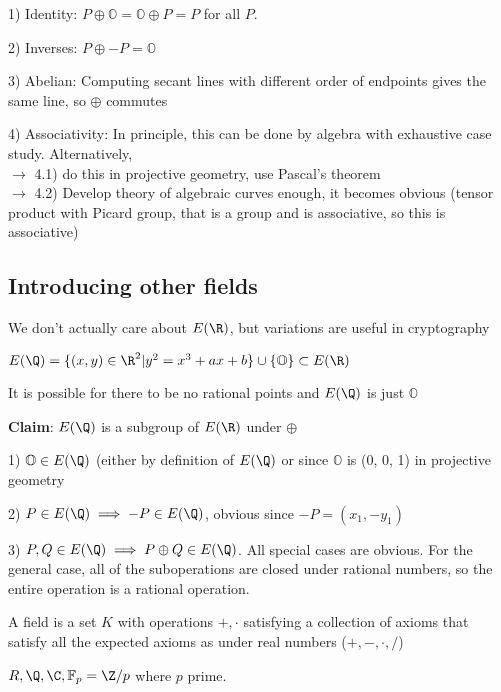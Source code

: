 \documentclass[twoside, 10pt]{article}
\newcommand{\F}{\mathbb{F}}
\renewcommand{\O}{\mathbb{O}}
\begin{document}
1) Identity: $P \oplus \O = \O\oplus P = P$ for all $P$.

2) Inverses: $P \oplus -P = \O$

3) Abelian: Computing secant lines with different order of endpoints gives the same line, so $\oplus$ commutes

4) Associativity: In principle, this can be done by algebra with exhaustive case study. Alternatively, \\
$\to$ 4.1) do this in projective geometry, use Pascal's theorem\\
$\to$ 4.2) Develop theory of algebraic curves enough, it becomes obvious (tensor product with Picard group, that is a group and is associative, so this is associative)

\subsection{Introducing other fields}
\begin{rmk}
    We don't actually care about $E(\R)$, but variations are useful in cryptography
\end{rmk}

\begin{defn}
    $E(\Q) = \{(x, y) \in \R^2 | y^2 = x^3 + ax + b\} \cup \{\O\} \subset E(\R)$
\end{defn}

\begin{rmk}
    It is possible for there to be no rational points and $E(\Q)$ is just $\O$
\end{rmk}

\textbf{Claim}: $E(\Q)$ is a subgroup of $E(\R)$ under $\oplus$

1) $\O \in E(\Q)$ (either by definition of $E(\Q)$ or since $\O$ is (0, 0, 1) in projective geometry

2) $P \in E(\Q) \implies -P \in E(\Q)$, obvious since $-P = (x_1, -y_1)$

3) $P, Q \in E(\Q) \implies P\oplus Q \in E(\Q)$. All special cases are obvious. For the general case, all of the suboperations are closed under rational numbers, so the entire operation is a rational operation.

\begin{rmk}
    A field is a set $K$ with operations $+, \cdot$ satisfying a collection of axioms that satisfy all the expected axioms as under real numbers ($+, -, \cdot, /$)
\end{rmk}

\begin{exm*}
    $R, \Q, \C, \F_p = \Z/p$ where $p$ prime.
\end{exm*}
\end{document}
